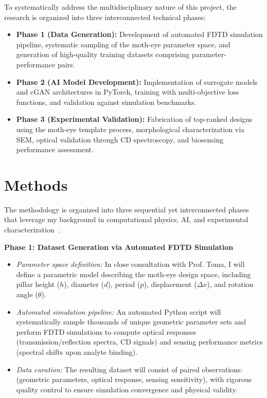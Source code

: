 \documentclass[12pt,a4paper]{article}
\begin{document}
To systematically address the multidisciplinary nature of this project, the research is organized into three interconnected technical phases:

\begin{itemize}
  \item \textbf{Phase 1 (Data Generation):} Development of automated FDTD simulation pipeline, systematic sampling of the moth-eye parameter space, and generation of high-quality training datasets comprising parameter-performance pairs.
  \item \textbf{Phase 2 (AI Model Development):} Implementation of surrogate models and cGAN architectures in PyTorch, training with multi-objective loss functions, and validation against simulation benchmarks.
  \item \textbf{Phase 3 (Experimental Validation):} Fabrication of top-ranked designs using the moth-eye template process, morphological characterization via SEM, optical validation through CD spectroscopy, and biosensing performance assessment.
\end{itemize}

\section{Methods}
The methodology is organized into three sequential yet interconnected phases that leverage my background in computational physics, AI, and experimental characterization~\cite{cv_zheng}.

\textbf{Phase 1: Dataset Generation via Automated FDTD Simulation}

\begin{itemize}
  \item \textit{Parameter space definition:} In close consultation with Prof. Toma, I will define a parametric model describing the moth-eye design space, including pillar height ($h$), diameter ($d$), period ($p$), displacement ($\Delta x$), and rotation angle ($\theta$).
  \item \textit{Automated simulation pipeline:} An automated Python script will systematically sample thousands of unique geometric parameter sets and perform FDTD simulations to compute optical responses (transmission/reflection spectra, CD signals) and sensing performance metrics (spectral shifts upon analyte binding).
  \item \textit{Data curation:} The resulting dataset will consist of paired observations: (geometric parameters, optical response, sensing sensitivity), with rigorous quality control to ensure simulation convergence and physical validity.
\end{itemize}
\end{document}

